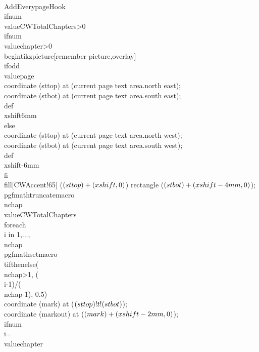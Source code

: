 \\AddEverypageHook{%
  \\ifnum\\value{CWTotalChapters}>0
    \\ifnum\\value{chapter}>0
      \\begin{tikzpicture}[remember picture,overlay]
        \\ifodd\\value{page}
          \\coordinate (sttop) at (current page text area.north east);
          \\coordinate (stbot) at (current page text area.south east);
          \\def\\xshift{6mm}
        \\else
          \\coordinate (sttop) at (current page text area.north west);
          \\coordinate (stbot) at (current page text area.south west);
          \\def\\xshift{-6mm}
        \\fi
        \\fill[CWAccent!65] ($(sttop)+(\\xshift,0)$) rectangle ($(stbot)+(\\xshift-4mm,0)$);
        \\pgfmathtruncatemacro{\\nchap}{\\value{CWTotalChapters}}
        \\foreach \\i in {1,...,\\nchap} {%
          \\pgfmathsetmacro{\\t}{ifthenelse(\\nchap>1, (\\i-1)/(\\nchap-1), 0.5)}%
          \\coordinate (mark) at ($(sttop)!\\t!(stbot)$);
          \\coordinate (markout) at ($(mark)+(\\xshift-2mm,0)$);
          \\ifnum\\i=\\value{chapter}
}}
